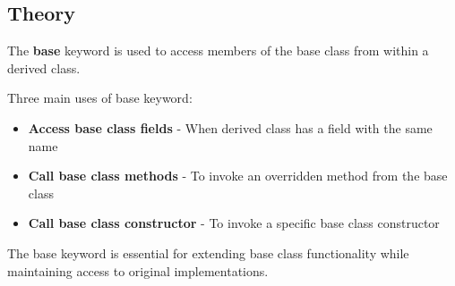 \documentclass[10pt,a4paper]{article}
\begin{document}
\subsection*{Theory}
The \textbf{base} keyword is used to access members of the base class from within a derived class.

Three main uses of base keyword:
\begin{itemize}
    \item \textbf{Access base class fields} - When derived class has a field with the same name
    \item \textbf{Call base class methods} - To invoke an overridden method from the base class
    \item \textbf{Call base class constructor} - To invoke a specific base class constructor
\end{itemize}

The base keyword is essential for extending base class functionality while maintaining access to original implementations.
\end{document}
